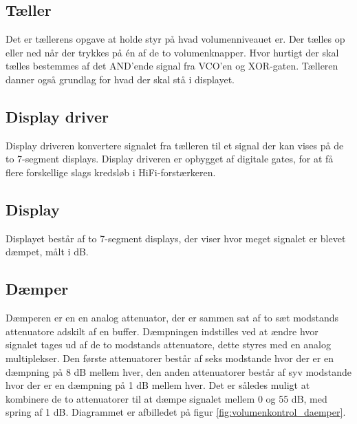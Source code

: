 \subsection*{Tæller}
\label{volumenkontrol-simulering-taeller}

Det er tællerens opgave at holde styr på hvad volumenniveauet er. Der tælles op eller ned når der trykkes på én af de to volumenknapper. Hvor hurtigt der skal tælles bestemmes af det AND'ende signal fra VCO'en og XOR-gaten. Tælleren danner også grundlag for hvad der skal stå i displayet.

\subsection*{Display driver}
\label{volumenkontrol-simulering-display_driver}

Display driveren konvertere signalet fra tælleren til et signal der kan vises på de to 7-segment displays. Display driveren er opbygget af digitale gates, for at få flere forskellige slags kredsløb i HiFi-forstærkeren.

\subsection*{Display}
\label{volumenkontrol-simulering-display}

Displayet består af to 7-segment displays, der viser hvor meget signalet er blevet dæmpet, målt i dB.

\subsection*{Dæmper}
\label{volumenkontrol-simulering-daemper}

Dæmperen er en en analog attenuator, der er sammen sat af to sæt modstands attenuatore adskilt af en buffer. Dæmpningen indstilles ved at ændre hvor signalet tages ud af de to modstands attenuatore, dette styres med en analog multiplekser. Den første attenuatorer består af seks modstande hvor der er en dæmpning på 8 dB mellem hver, den anden attenuatorer består af syv modstande hvor der er en dæmpning på 1 dB mellem hver. Det er således muligt at kombinere de to attenuatorer til at dæmpe signalet mellem 0 og 55 dB, med spring af 1 dB. Diagrammet er afbilledet på figur \ref{fig:volumenkontrol_daemper}.

